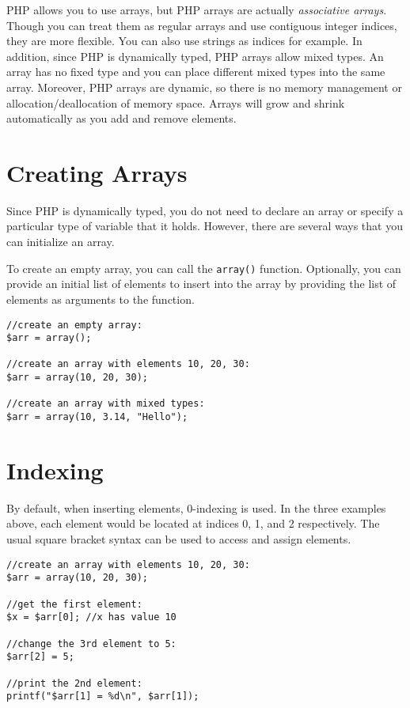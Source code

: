 

PHP allows you to use arrays, but PHP arrays are actually
\emph{associative arrays}.  Though you can treat them
as regular arrays and use contiguous integer indices, they
are more flexible.  You can also use strings as indices for
example.  In addition, since PHP is dynamically typed, PHP 
arrays allow mixed types.  An array has no fixed type and 
you can place different mixed types into the same array.
Moreover, PHP arrays are dynamic, so there is no memory
management or allocation/deallocation of memory space.
Arrays will grow and shrink automatically as you add and 
remove elements.

\section{Creating Arrays}

Since PHP is dynamically typed, you do not need to 
declare an array or specify a particular type
of variable that it holds.  However, there are several
ways that you can initialize an array.

To create an empty array, you can call the \texttt{array()}
function.  Optionally, you can provide an initial list of elements
to insert into the array by providing the list of elements as 
arguments to the function.

\begin{verbatim}
//create an empty array:
$arr = array();

//create an array with elements 10, 20, 30:
$arr = array(10, 20, 30);

//create an array with mixed types:
$arr = array(10, 3.14, "Hello");
\end{verbatim}

\section{Indexing}

By default, when inserting elements, 0-indexing is used.
In the three examples above, each element would be
located at indices 0, 1, and 2 respectively.  The usual
square bracket syntax can be used to access and 
assign elements.

\begin{verbatim}
//create an array with elements 10, 20, 30:
$arr = array(10, 20, 30);

//get the first element:
$x = $arr[0]; //x has value 10

//change the 3rd element to 5:
$arr[2] = 5;

//print the 2nd element:
printf("$arr[1] = %d\n", $arr[1]);
\end{verbatim}

